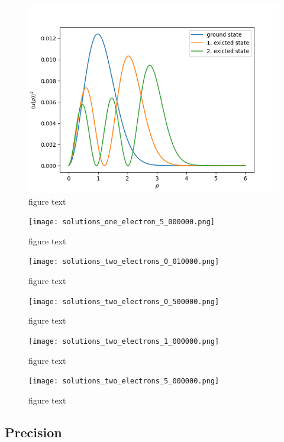 \documentclass[10pt,a4paper]{article}
\begin{document}
\begin{figure}[H]
	\includegraphics[width =1.2\textwidth]{solutions_one_electron_1_000000.png}
	\caption[contents title]{figure text}
\end{figure}

\begin{figure}[H]
	\texttt{[image: solutions\_one\_electron\_5\_000000.png]}
	\caption[contents title]{figure text}
\end{figure}

\begin{figure}[H]
	\texttt{[image: solutions\_two\_electrons\_0\_010000.png]}
	\caption[contents title]{figure text}
\end{figure}

\begin{figure}[H]
	\texttt{[image: solutions\_two\_electrons\_0\_500000.png]}
	\caption[contents title]{figure text}
\end{figure}

\begin{figure}[H]
	\texttt{[image: solutions\_two\_electrons\_1\_000000.png]}
	\caption[contents title]{figure text}
\end{figure}

\begin{figure}[H]
	\texttt{[image: solutions\_two\_electrons\_5\_000000.png]}
	\caption[contents title]{figure text}
\end{figure}


\subsection{Precision}
\end{document}
